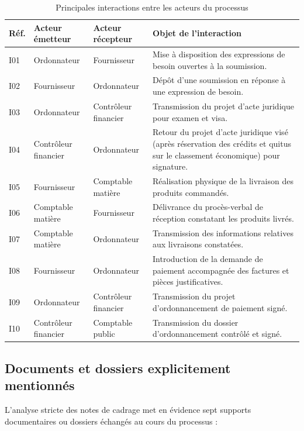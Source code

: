\begin{table}[H]
\centering
\small
\caption{Principales interactions entre les acteurs du processus}
\label{tab:interactions}
\begin{tabularx}{\linewidth}{L{1.1cm} L{3.2cm} L{3.2cm} Y}
\toprule
\textbf{\sffamily Réf.} & \textbf{\sffamily Acteur émetteur} & \textbf{\sffamily Acteur récepteur} & \textbf{\sffamily Objet de l'interaction} \\
\midrule
I01 & Ordonnateur & Fournisseur & Mise à disposition des expressions de besoin ouvertes à la soumission. \\
I02 & Fournisseur & Ordonnateur & Dépôt d'une soumission en réponse à une expression de besoin. \\
I03 & Ordonnateur & Contrôleur financier & Transmission du projet d'acte juridique pour examen et visa. \\
I04 & Contrôleur financier & Ordonnateur & Retour du projet d'acte juridique visé (après réservation des crédits et quitus sur le classement économique) pour signature. \\
I05 & Fournisseur & Comptable matière & Réalisation physique de la livraison des produits commandés. \\
I06 & Comptable matière & Fournisseur & Délivrance du procès-verbal de réception constatant les produits livrés. \\
I07 & Comptable matière & Ordonnateur & Transmission des informations relatives aux livraisons constatées. \\
I08 & Fournisseur & Ordonnateur & Introduction de la demande de paiement accompagnée des factures et pièces justificatives. \\
I09 & Ordonnateur & Contrôleur financier & Transmission du projet d'ordonnancement de paiement signé. \\
I10 & Contrôleur financier & Comptable public & Transmission du dossier d'ordonnancement contrôlé et signé. \\
\bottomrule
\end{tabularx}
\end{table}

\subsection{Documents et dossiers explicitement mentionnés}

L'analyse stricte des notes de cadrage met en évidence sept supports documentaires ou dossiers échangés au cours du processus :

